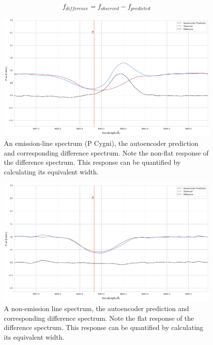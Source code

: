 \begin{equation}
   f_{difference} = f_{observed} - f_{predicted}
\end{equation}

\begin{figure}[!htb]
\centering
\includegraphics[scale=0.45]{figures/normal difference.png}
\caption{An emission-line spectrum (P Cygni), the autoencoder prediction and corresponding difference spectrum. Note the non-flat response of the difference spectrum. This response can be quantified by calculating its equivalent width.}
\label{fig6.3}
\end{figure}

\begin{figure}[!htb]
\centering
\includegraphics[scale=0.45]{figures/non emission difference.png}
\caption{A non-emission line spectrum, the autoencoder prediction and corresponding difference spectrum. Note the flat response of the difference spectrum. This response can be quantified by calculating its equivalent width.}
\label{fig6.4}
\end{figure}

